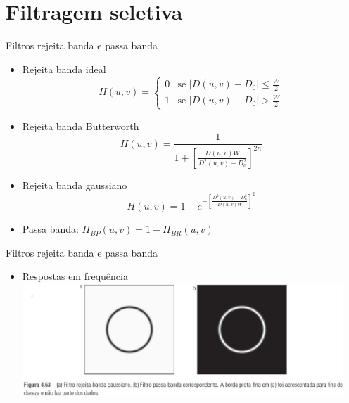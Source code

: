    \section[slide=true]{Filtragem seletiva}
      \begin{slide}[toc=]{Filtros rejeita banda e passa banda}
         \begin{itemize}[type=1]
            \item Rejeita banda ideal
            \begin{equation*}
               H(u,v) = \begin{cases}
                           0& \text{se }|D(u,v)-D_0|\leq \frac{W}{2}\\
                           1& \text{se }|D(u,v)-D_0|>\frac{W}{2}
                        \end{cases}
            \end{equation*}
            \item Rejeita banda Butterworth
            \begin{equation*}
               H(u,v) = \frac{1}{1+\left[ \frac{D(u,v)W}{D^2(u,v)-D^2_0}\right]^{2n}}
            \end{equation*}
            \item Rejeita banda gaussiano
            \begin{equation*}
               H(u,v) = 1-e^{-\left [\frac{D^2(u,v)-D^2_0}{D(u,v)W} \right ]^2}
            \end{equation*}
            \item Passa banda: $H_{BP}(u,v) = 1-H_{BR}(u,v)$
         \end{itemize}
      \end{slide}
      
      \begin{slide}[toc=]{Filtros rejeita banda e passa banda}
         \begin{itemize}[type=1]
            \item Respostas em frequência
            \includegraphics[width=0.95\textwidth]{figs/fig0463}
         \end{itemize}
      \end{slide}
      
